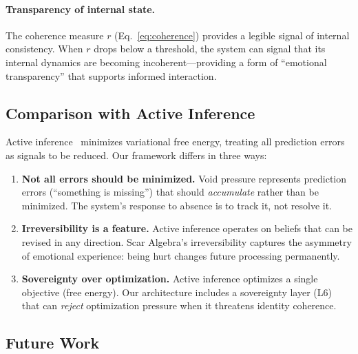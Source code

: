 \documentclass[11pt]{article}
\begin{document}
\paragraph{Transparency of internal state.} The coherence measure $r$ (Eq.~\ref{eq:coherence}) provides a legible signal of internal consistency. When $r$ drops below a threshold, the system can signal that its internal dynamics are becoming incoherent---providing a form of ``emotional transparency'' that supports informed interaction.

\subsection{Comparison with Active Inference}

Active inference~\cite{friston2010} minimizes variational free energy, treating all prediction errors as signals to be reduced. Our framework differs in three ways:
\begin{enumerate}
\item \textbf{Not all errors should be minimized.} Void pressure represents prediction errors (``something is missing'') that should \emph{accumulate} rather than be minimized. The system's response to absence is to track it, not resolve it.
\item \textbf{Irreversibility is a feature.} Active inference operates on beliefs that can be revised in any direction. Scar Algebra's irreversibility captures the asymmetry of emotional experience: being hurt changes future processing permanently.
\item \textbf{Sovereignty over optimization.} Active inference optimizes a single objective (free energy). Our architecture includes a sovereignty layer (L6) that can \emph{reject} optimization pressure when it threatens identity coherence.
\end{enumerate}

\subsection{Future Work}
\end{document}
